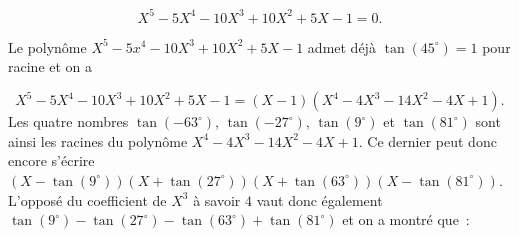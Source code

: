 {\begin{enumerate}
{$$X^5-5X^4-10X^3+10X^2+5X-1=0.$$

Le polynôme $X^5-5x^4-10X^3+10X^2+5X-1$ admet déjà $\tan(45^\circ)=1$ pour racine et on a

$$X^5-5X^4-10X^3+10X^2+5X-1=(X-1)(X^4-4X^3-14X^2-4X+1).$$
Les quatre nombres $\tan(-63^\circ)$, $\tan(-27^\circ)$, $\tan(9^\circ)$ et $\tan(81^\circ)$ sont ainsi les racines du
polynôme $X^4-4X^3-14X^2-4X+1$. Ce dernier peut donc encore s'écrire
$(X-\tan(9^\circ))(X+\tan(27^\circ))(X+\tan(63^\circ))(X-\tan(81^\circ))$. L'opposé du coefficient de $X^3$ à savoir $4$
vaut donc également $\tan(9^\circ)-\tan(27^\circ)-\tan(63^\circ)+\tan(81^\circ)$ et on a montré que~:

\begin{center}
\end{center}}
\end{enumerate}
}

